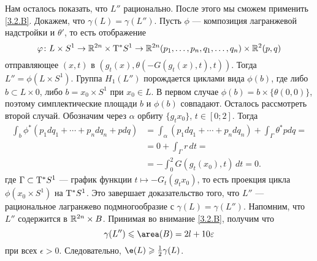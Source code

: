 Нам осталось показать, что $L''$ рационально.
После этого мы сможем применить \ref{3.2.B}.
Докажем, что $\gamma (L) = \gamma (L'')$.
Пусть $\phi$ — композиция лагранжевой надстройки и $\theta'$,
то есть отображение 
\[\varphi\colon 
L \times S^1
\to
\mathbb{R}^{2n} \times \mathrm{T}^\ast S^1
\to
\mathbb{R}^{2n} (p_1,\dots, p_n, q_1,\dots, q_n) \times \mathbb{R}^2 (p, q)\]
отправляющее $(x, t)$ в $(g_t (x), \theta (-G (g_t (x), t), t))$.
Тогда $L''=\phi(L \times S^1)$.
Группа $H_1 (L'')$ порождается циклами вида $\phi (b)$, где либо $b \subset L \times {0}$, либо $b = {x_0} \times S^1$ при $x_0 \in L$.
В первом случае $\phi (b) = b \times \{\theta (0, 0)\}$, поэтому симплектические площади $b$ и $\phi (b)$ совпадают.
Осталось рассмотреть второй случай.
Обозначим через $\alpha$ орбиту $\{g_t x_0\}$, $t \in [0; 2]$.
Тогда
\begin{align*}
\int_b\phi^\ast (p_1 dq_1 +\!\cdots\!
+ p_n dq_n + pdq)
&= \int_\alpha (p_1 dq_1 +\!\cdots\!
+ p_n dq_n) + \int_{\Gamma}\theta^\ast pdq =
\\
&= 0 + \int_{\Gamma} r\,dt =
\\
&= - \int_0^2G (g_t (x_0), t)\,dt 
= 0.
\end{align*}
где $\Gamma\subset \mathrm{T}^\ast S^{1}$  — график функции $t\mapsto -G_{t}(g_{t}x_{0})$, то есть проекция цикла $\phi(x_{0}\times S^{1})$ на $\mathrm{T}^\ast S^{1}$.
Это завершает доказательство того, что $L''$ — рациональное лагранжево подмногообразие с $\gamma (L) = \gamma (L'')$.
Напомним, что $L''$ содержится в $\mathbb{R}^{2n} \times B$.
Принимая во внимание \ref{3.2.B}, получим что
\[\gamma (L'') \le \area (B) = 2l + 10\epsilon\]
при всех $\epsilon> 0$.
Следовательно, $\e(L) \ge \tfrac12 \gamma (L)$.
\qeds

